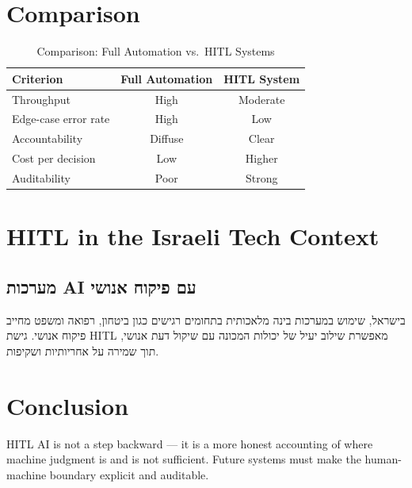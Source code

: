 \documentclass[12pt,a4paper]{article}
\begin{document}
\section{Comparison}
\begin{table}[htbp]
\centering
\begin{tabular}{lcc}
\toprule
Criterion & Full Automation & HITL System \\
\midrule
Throughput           & High    & Moderate \\
Edge-case error rate & High    & Low      \\
Accountability       & Diffuse & Clear    \\
Cost per decision    & Low     & Higher   \\
Auditability         & Poor    & Strong   \\
\bottomrule
\end{tabular}
\caption{Comparison: Full Automation vs.\ HITL Systems}
\label{tab:comparison}
\end{table}
\section{HITL in the Israeli Tech Context}
\begin{otherlanguage}{hebrew}
\subsection*{מערכות AI עם פיקוח אנושי}
בישראל, שימוש במערכות בינה מלאכותית בתחומים רגישים כגון ביטחון, רפואה
ומשפט מחייב פיקוח אנושי. גישת HITL מאפשרת שילוב יעיל של יכולות המכונה
עם שיקול דעת אנושי, תוך שמירה על אחריותיות ושקיפות.
\end{otherlanguage}
\section{Conclusion}
HITL AI is not a step backward --- it is a more honest accounting of where
machine judgment is and is not sufficient. Future systems must make the
human-machine boundary explicit and auditable.


\end{document}
